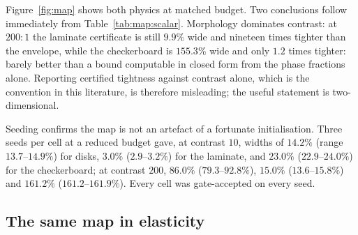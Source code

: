 \begin{table}[t]
\centering
\caption{Certified relative width against phase contrast and morphology,
scalar conductivity, $n_q = 64$, $200$ steps. Every entry passed the
quality gate and every certificate was valid. Tightening relative to the
Voigt--Reuss envelope in parentheses.}
\label{tab:map:scalar}
\end{table}

Figure~\ref{fig:map} shows both physics at matched budget. Two
conclusions follow immediately from Table~\ref{tab:map:scalar}.
Morphology dominates contrast: at $200{:}1$ the laminate certificate is
still $9.9\%$ wide and nineteen times tighter than the envelope, while the
checkerboard is $155.3\%$ wide and only $1.2$ times tighter: barely better than a bound computable in closed form from the phase
fractions alone. Reporting certified tightness against contrast alone,
which is the convention in this literature, is therefore misleading; the
useful statement is two-dimensional.

Seeding confirms the map is not an artefact of a fortunate initialisation.
Three seeds per cell at a reduced budget gave, at contrast $10$, widths of
$14.2\%$ (range $13.7$--$14.9\%$) for disks, $3.0\%$ ($2.9$--$3.2\%$) for
the laminate, and $23.0\%$ ($22.9$--$24.0\%$) for the checkerboard; at
contrast $200$, $86.0\%$ ($79.3$--$92.8\%$), $15.0\%$ ($13.6$--$15.8\%$)
and $161.2\%$ ($161.2$--$161.9\%$). Every cell was gate-accepted on every
seed.

\subsection{The same map in elasticity}
\label{sec:limits:elastic}

